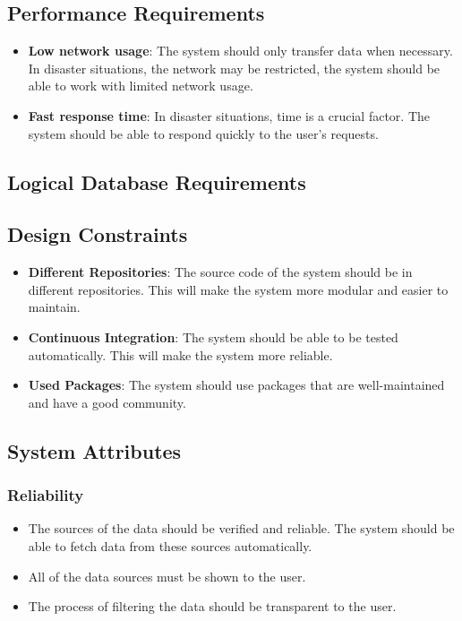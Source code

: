 \documentclass[a4paper]{article}
\begin{document}
        \subsection{Performance Requirements}
        
        \begin{itemize}
            \item \textbf{Low network usage}: The system should only transfer data when necessary. In disaster situations, the network may be restricted, the system should be able to work with limited network usage.
            \item \textbf{Fast response time}: In disaster situations, time is a crucial factor. The system should be able to respond quickly to the user's requests.
        \end{itemize}
        
        \subsection{Logical Database Requirements}


        \subsection{Design Constraints}

        \begin{itemize}
            \item \textbf{Different Repositories}: The source code of the system should be in different repositories. This will make the system more modular and easier to maintain.
            \item \textbf{Continuous Integration}: The system should be able to be tested automatically. This will make the system more reliable.
            \item \textbf{Used Packages}: The system should use packages that are well-maintained and have a good community.
        \end{itemize}

        \subsection{System Attributes}

        \subsubsection{Reliability}
            \begin{itemize}
                \item The sources of the data should be verified and reliable. The system should be able to fetch data from these sources automatically.
                \item All of the data sources must be shown to the user.
                \item The process of filtering the data should be transparent to the user.
            \end{itemize}
\end{document}
